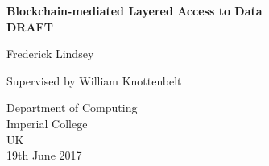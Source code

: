 \documentclass[twoside, a4paper, titlepage]{article}
\begin{document}
\pagestyle{empty}

\begin{titlepage}
  \centering
  \vspace*{1cm}

  \vspace{0.5cm}
  \Large{\textbf{Blockchain-mediated Layered Access to Data}} \\
  \Huge{\textbf{DRAFT}}

  \vspace{1.5cm}

  \large{Frederick Lindsey}

  \vfill

  \large{Supervised by William Knottenbelt}

  \vspace{0.8cm}

  Department of Computing\\
  Imperial College\\
  UK\\
  19th June 2017
\end{titlepage}


\tableofcontents




\pagestyle{fancy}
\rhead{\firstxmark} %
\lfoot{\lastxmark} %
\cfoot{} %
\renewcommand\headrulewidth{0.4pt} %
\renewcommand\footrulewidth{0.4pt} %

% 

% 



% 
\end{document}
